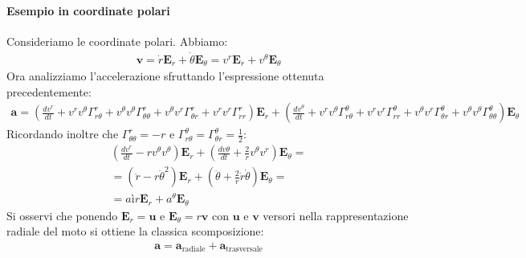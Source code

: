 \paragraph*{Esempio in coordinate polari} Consideriamo le coordinate polari. Abbiamo:
\begin{align*}
    \mathbf{v}=\dot{r}\mathbf{E}_r+\dot{\theta}\mathbf{E}_\theta=v^r\mathbf{E}_r+v^\theta\mathbf{E}_\theta
\end{align*}
Ora analizziamo l'accelerazione sfruttando l'espressione ottenuta precedentemente:
\begin{align*}
    \mathbf{a}=(\frac{dv^r}{dt}+v^rv^\theta\Gamma^r_{r\theta}+v^\theta v^\theta\Gamma^r_{\theta \theta}+v^\theta v^r\Gamma^r_{\theta r}+v^rv^r\Gamma^r_{rr})\mathbf{E}_r+(\frac{dv^\theta}{dt}+v^rv^\theta\Gamma^\theta_{r\theta}+v^r v^r\Gamma^\theta_{rr}+v^\theta v^r\Gamma^\theta_{\theta r}+v^\theta v^\theta \Gamma^\theta_{\theta \theta})\mathbf{E}_\theta
\end{align*}
Ricordando inoltre che $\Gamma^r_{\theta \theta}=-r$ e $\Gamma^\theta_{r \theta}=\Gamma^\theta_{\theta r}=\frac{1}{2}$:
\begin{align*}
    \left(\frac{dv^r}{dt}-rv^\theta v^\theta\right)\mathbf{E}_r+\left(\frac{dv\theta}{dt}+\frac{2}{r}v^\theta v^r\right)\mathbf{E}_\theta=\\
    =(\ddot{r}-r\ddot{\theta}^2)\mathbf{E}_r+(\ddot{\theta}+\frac{2}{r}\dot{r}\dot{\theta})\mathbf{E}_\theta=\\
    =aìr\mathbf{E}_r+a^\theta\mathbf{E}_\theta
\end{align*}
Si osservi che ponendo $\mathbf{E}_r=\mathbf{u}$ e $\mathbf{E}_\theta=r\mathbf{v}$ con $\mathbf{u}$ e $\mathbf{v}$ versori nella rappresentazione radiale del moto si ottiene la classica scomposizione:
\begin{align*}
    \mathbf{a}=\mathbf{a}_{\text{radiale}}+\mathbf{a}_{\text{trasversale}}
\end{align*} 
